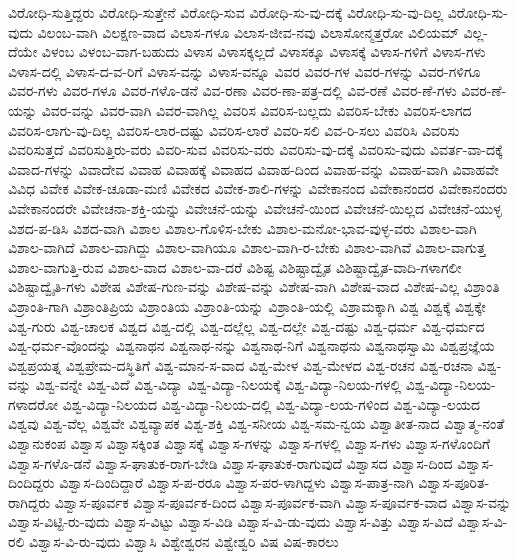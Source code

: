 {ವಿರೋಧಿ-ಸುತ್ತಿದ್ದರು
ವಿರೋಧಿ-ಸುತ್ತೇನೆ
ವಿರೋಧಿ-ಸುವ
ವಿರೋಧಿ-ಸು-ವು-ದಕ್ಕೆ
ವಿರೋಧಿ-ಸು-ವು-ದಿಲ್ಲ
ವಿರೋಧಿ-ಸು-ವುದು
ವಿಲಂಬ-ವಾಗಿ
ವಿಲಕ್ಷಣ-ವಾದ
ವಿಲಾಸ-ಗಳೂ
ವಿಲಾಸ-ಜೀವ-ನವು
ವಿಲಾಸೋನ್ಮತ್ತರೋ
ವಿಲಿಯಮ್
ವಿಲ್ಲ-ದೆಯೇ
ವಿಳಂಬ
ವಿಳಂಬ-ವಾಗ-ಬಹುದು
ವಿಳಾಸ
ವಿಳಾಸಕ್ಕಲ್ಲದೆ
ವಿಳಾಸಕ್ಕೂ
ವಿಳಾಸಕ್ಕೆ
ವಿಳಾಸ-ಗಳಿಗೆ
ವಿಳಾಸ-ಗಳು
ವಿಳಾಸ-ದಲ್ಲಿ
ವಿಳಾಸ-ದ-ವ-ರಿಗೆ
ವಿಳಾಸ-ವನ್ನು
ವಿಳಾಸ-ವನ್ನೂ
ವಿವರ
ವಿವರ-ಗಳ
ವಿವರ-ಗಳನ್ನು
ವಿವರ-ಗಳಿಗೂ
ವಿವರ-ಗಳು
ವಿವರ-ಗಳೂ
ವಿವರ-ಗಳೊ-ಡನೆ
ವಿವ-ರಣಾ
ವಿವರ-ಣಾ-ಪತ್ರ-ದಲ್ಲಿ
ವಿವ-ರಣೆ
ವಿವರ-ಣೆ-ಗಳು
ವಿವರ-ಣೆ-ಯನ್ನು
ವಿವರ-ವನ್ನು
ವಿವರ-ವಾಗಿ
ವಿವರ-ವಾಗಿಲ್ಲ
ವಿವರಿಸ
ವಿವರಿಸ-ಬಲ್ಲದು
ವಿವರಿಸ-ಬೇಕು
ವಿವರಿಸ-ಲಾಗದ
ವಿವರಿಸ-ಲಾಗು-ವು-ದಿಲ್ಲ
ವಿವರಿಸ-ಲಾರ-ದಷ್ಟು
ವಿವರಿಸ-ಲಾರೆ
ವಿವರಿ-ಸಲಿ
ವಿವ-ರಿ-ಸಲು
ವಿವರಿಸಿ
ವಿವರಿಸು
ವಿವರಿಸುತ್ತದೆ
ವಿವರಿಸುತ್ತಿರು-ವರು
ವಿವರಿ-ಸುವ
ವಿವರಿಸು-ವರು
ವಿವರಿಸು-ವು-ದಕ್ಕೆ
ವಿವರಿಸು-ವುದು
ವಿವರ್ತ-ವಾ-ದಕ್ಕೆ
ವಿವಾದ-ಗಳನ್ನು
ವಿವಾದೇವ
ವಿವಾಹ
ವಿವಾಹಕ್ಕೆ
ವಿವಾಹದ
ವಿವಾಹ-ದಿಂದ
ವಿವಾಹ-ವನ್ನು
ವಿವಾಹ-ವಾಗಿ
ವಿವಾಹವೇ
ವಿವಿಧ
ವಿವೇಕ
ವಿವೇಕ-ಚೂಡಾ-ಮಣಿ
ವಿವೇಕದ
ವಿವೇಕ-ಶಾಲಿ-ಗಳನ್ನು
ವಿವೇಕಾನಂದ
ವಿವೇಕಾನಂದರ
ವಿವೇಕಾನಂದರು
ವಿವೇಕಾನಂದರೇ
ವಿವೇಚನಾ-ಶಕ್ತಿ-ಯನ್ನು
ವಿವೇಚನೆ-ಯನ್ನು
ವಿವೇಚನೆ-ಯಿಂದ
ವಿವೇಚನೆ-ಯಿಲ್ಲದ
ವಿವೇಚನೆ-ಯುಳ್ಳ
ವಿಶದ-ಪ-ಡಿಸಿ
ವಿಶದ-ವಾಗಿ
ವಿಶಾಲ
ವಿಶಾಲ-ಗೊಳಿಸ-ಬೇಕು
ವಿಶಾಲ-ಮನೋ-ಭಾವ-ವುಳ್ಳ-ವರು
ವಿಶಾಲ-ವಾಗಿ
ವಿಶಾಲ-ವಾಗಿದೆ
ವಿಶಾಲ-ವಾಗಿದ್ದು
ವಿಶಾಲ-ವಾಗಿಯೂ
ವಿಶಾಲ-ವಾಗಿ-ರ-ಬೇಕು
ವಿಶಾಲ-ವಾಗಿವೆ
ವಿಶಾಲ-ವಾಗುತ್ತ
ವಿಶಾಲ-ವಾಗುತ್ತಿ-ರುವ
ವಿಶಾಲ-ವಾದ
ವಿಶಾಲ-ವಾ-ದರೆ
ವಿಶಿಷ್ಟ
ವಿಶಿಷ್ಟಾದ್ವೈತ
ವಿಶಿಷ್ಟಾದ್ವೈತ-ವಾದಿ-ಗಳಾಗಲೀ
ವಿಶಿಷ್ಟಾದ್ವೈತಿ-ಗಳು
ವಿಶೇಷ
ವಿಶೇಷ-ಗುಣ-ವನ್ನು
ವಿಶೇಷ-ವನ್ನು
ವಿಶೇಷ-ವಾಗಿ
ವಿಶೇಷ-ವಾದ
ವಿಶೇಷ-ವಿಲ್ಲ
ವಿಶ್ರಾಂತಿ
ವಿಶ್ರಾಂತಿ-ಗಾಗಿ
ವಿಶ್ರಾಂತಿಪ್ರಿಯ
ವಿಶ್ರಾಂತಿಯ
ವಿಶ್ರಾಂತಿ-ಯನ್ನು
ವಿಶ್ರಾಂತಿ-ಯಲ್ಲಿ
ವಿಶ್ರಾಮಕ್ಕಾಗಿ
ವಿಶ್ವ
ವಿಶ್ವಕ್ಕೆ
ವಿಶ್ವಕ್ಕೇ
ವಿಶ್ವ-ಗುರು
ವಿಶ್ವ-ಚಾಲಕ
ವಿಶ್ವದ
ವಿಶ್ವ-ದಲ್ಲಿ
ವಿಶ್ವ-ದಲ್ಲೆಲ್ಲ
ವಿಶ್ವ-ದಲ್ಲೇ
ವಿಶ್ವ-ದಷ್ಟು
ವಿಶ್ವ-ಧರ್ಮ
ವಿಶ್ವ-ಧರ್ಮದ
ವಿಶ್ವ-ಧರ್ಮ-ವೊಂದನ್ನು
ವಿಶ್ವನಾಥನ
ವಿಶ್ವನಾಥ-ನನ್ನು
ವಿಶ್ವನಾಥ-ನಿಗೆ
ವಿಶ್ವನಾಥನು
ವಿಶ್ವನಾಥಸ್ವಾಮಿ
ವಿಶ್ವಪ್ರಜ್ಞೆಯ
ವಿಶ್ವಪ್ರಯತ್ನ
ವಿಶ್ವಪ್ರೇಮ-ದಸ್ಥಿತಿಗೆ
ವಿಶ್ವ-ಮಾನ-ಸ-ವಾದ
ವಿಶ್ವ-ಮೇಳ
ವಿಶ್ವ-ಮೇಳದ
ವಿಶ್ವ-ರಚನ
ವಿಶ್ವ-ರಚನಾ
ವಿಶ್ವ-ವನ್ನು
ವಿಶ್ವ-ವನ್ನೇ
ವಿಶ್ವ-ವಿದೆ
ವಿಶ್ವ-ವಿದ್ಯಾ
ವಿಶ್ವ-ವಿದ್ಯಾ-ನಿಲಯಕ್ಕೆ
ವಿಶ್ವ-ವಿದ್ಯಾ-ನಿಲಯ-ಗಳಲ್ಲಿ
ವಿಶ್ವ-ವಿದ್ಯಾ-ನಿಲಯ-ಗಳಾದರೋ
ವಿಶ್ವ-ವಿದ್ಯಾ-ನಿಲಯದ
ವಿಶ್ವ-ವಿದ್ಯಾ-ನಿಲಯ-ದಲ್ಲಿ
ವಿಶ್ವ-ವಿದ್ಯಾ-ಲಯ-ಗಳಿಂದ
ವಿಶ್ವ-ವಿದ್ಯಾ-ಲಯದ
ವಿಶ್ವವು
ವಿಶ್ವ-ವೆಲ್ಲ
ವಿಶ್ವವೇ
ವಿಶ್ವವ್ಯಾಪಕ
ವಿಶ್ವ-ಶಕ್ತಿ
ವಿಶ್ವ-ಸನೀಯ
ವಿಶ್ವ-ಸಮ-ನ್ವಯ
ವಿಶ್ವಾತೀತ-ನಾದ
ವಿಶ್ವಾತ್ಮ-ನಂತೆ
ವಿಶ್ವಾನುಕಂಪ
ವಿಶ್ವಾಸ
ವಿಶ್ವಾಸಕ್ಕಿಂತ
ವಿಶ್ವಾಸಕ್ಕೆ
ವಿಶ್ವಾಸ-ಗಳನ್ನು
ವಿಶ್ವಾಸ-ಗಳಲ್ಲಿ
ವಿಶ್ವಾಸ-ಗಳು
ವಿಶ್ವಾಸ-ಗಳೊಂದಿಗೆ
ವಿಶ್ವಾಸ-ಗಳೊ-ಡನೆ
ವಿಶ್ವಾಸ-ಘಾತುಕ-ರಾಗ-ಬೇಡಿ
ವಿಶ್ವಾಸ-ಘಾತುಕ-ರಾಗುವುದೆ
ವಿಶ್ವಾಸದ
ವಿಶ್ವಾಸ-ದಿಂದ
ವಿಶ್ವಾಸ-ದಿಂದಿದ್ದರು
ವಿಶ್ವಾಸ-ದಿಂದಿದ್ದಾರೆ
ವಿಶ್ವಾಸ-ಪ-ರರೂ
ವಿಶ್ವಾಸ-ಪರ-ಳಾಗಿದ್ದಳು
ವಿಶ್ವಾಸ-ಪಾತ್ರ-ನಾಗಿ
ವಿಶ್ವಾಸ-ಪೂರಿತ-ರಾಗಿದ್ದರು
ವಿಶ್ವಾಸ-ಪೂರ್ವಕ
ವಿಶ್ವಾಸ-ಪೂರ್ವಕ-ದಿಂದ
ವಿಶ್ವಾಸ-ಪೂರ್ವಕ-ವಾಗಿ
ವಿಶ್ವಾಸ-ಪೂರ್ವಕ-ವಾದ
ವಿಶ್ವಾಸ-ವನ್ನು
ವಿಶ್ವಾಸ-ವಿಟ್ಟಿ-ರು-ವುದು
ವಿಶ್ವಾಸ-ವಿಟ್ಟು
ವಿಶ್ವಾಸ-ವಿಡಿ
ವಿಶ್ವಾಸ-ವಿ-ಡು-ವುದು
ವಿಶ್ವಾಸ-ವಿತ್ತು
ವಿಶ್ವಾಸ-ವಿದೆ
ವಿಶ್ವಾಸ-ವಿ-ರಲಿ
ವಿಶ್ವಾಸ-ವಿ-ರು-ವುದು
ವಿಶ್ವಾಸಿ
ವಿಶ್ವೇಶ್ವರನ
ವಿಶ್ವೇಶ್ವರಿ
ವಿಷ
ವಿಷ-ಕಾರಲು
}
